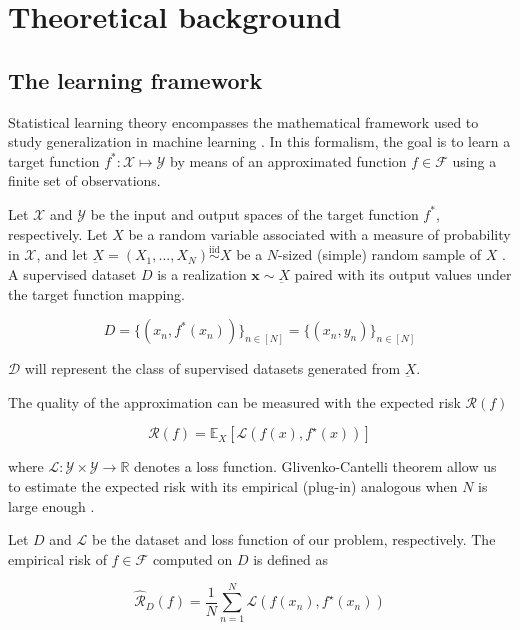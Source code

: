 \chapter{Theoretical background }\label{sec:theory}

\section{The learning framework}

Statistical learning theory encompasses the mathematical framework used to
study generalization in machine learning
\cite{n.vapnikNatureStatisticalLearning2000,jimenezInductiveBiasDeep}.
In this formalism, the goal
is to learn a target function $f^*: \mathcal{X} \longmapsto \mathcal{Y}$ by means of an approximated
function $f \in \mathcal{F}$ using a finite set of observations. 

\begin{definition}\label{def:dataset}
    Let $\mathcal{X}$ and $\mathcal{Y}$ be
    the input and output spaces of the target function $f^*$, respectively. Let $X$ 
    be a random variable associated with a measure of probability in $\mathcal{X}$, 
    and let $\underbar{X} = (X_1, ..., X_N) \overset{\text{iid}}{\sim} X$ be a $N$-sized (simple)
    random sample of $X$ 
    \cite{casellaStatisticalInference2002}.
    A supervised dataset $D$ is a realization
     $\bm{x} \sim \underbar{X}$ paired with its output values under the 
     target function mapping.

    $$
    D = \{(x_n, f^*(x_n))\}_{n \in [N]} = \{(x_n, y_n)\}_{n \in [N]}
    $$

    $\mathcal{D}$ will represent the class of supervised datasets generated from $\underbar{X}$.
\end{definition}

The quality of the approximation can be measured with the expected risk $\mathcal{R}(f)$

$$
\mathcal{R}(f)=\mathbb{E}_{X} [\mathcal{L}(f(x),f^\star(x))]
$$

where $\mathcal{L}: \mathcal{Y} \times \mathcal{Y} \to \mathbb{R}$ denotes a loss function. Glivenko-Cantelli theorem allow us to
estimate the expected risk with its empirical (plug-in) analogous when $N$ is large enough \cite{gutIntermediateCourseProbability2009}.

\begin{definition}\label{def:erm}
    Let $D$ and $\mathcal{L}$ be the dataset and loss function of our problem, respectively. The empirical risk of $f \in \mathcal{F}$
    computed on $D$ is defined as

    $$
    \hat{\mathcal{R}}_D(f)=\frac{1}{N}\sum_{n=1}^{N}\mathcal{L}(f(x_{n}),f^{\star}(x_{n}))
    $$
\end{definition}

